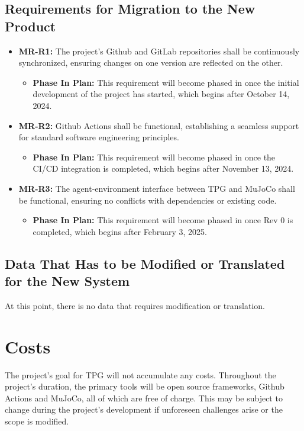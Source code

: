 \documentclass[12pt]{article}
\begin{document}
\subsection{Requirements for Migration to the New Product}
\begin{itemize}
  \item \label{MR-R1} \textbf{MR-R1:} The project’s Github and GitLab repositories shall be continuously synchronized, ensuring changes on one version are reflected on the other.
  
\begin{itemize}
  \item \textbf{Phase In Plan:} This requirement will become phased in once the initial development of the project has started, which begins after October 14, 2024. 

\end{itemize}

  \item \label{MR-R2} \textbf{MR-R2:} Github Actions shall be functional, establishing a seamless support for standard software engineering principles.
  \begin{itemize}
  \item \textbf{Phase In Plan:} This requirement will become phased in once the CI/CD integration is completed, which begins after November 13, 2024. 
\end{itemize}
  \item \label{MR-R3} \textbf{MR-R3:} The agent-environment interface between TPG and MuJoCo shall be functional, ensuring no conflicts with dependencies or existing code.
  \begin{itemize}
  \item \textbf{Phase In Plan:} This requirement will become phased in once Rev 0 is completed, which begins after February 3, 2025. 
\end{itemize}
\end{itemize}

\subsection{Data That Has to be Modified or Translated for the New System}
At this point, there is no data that requires modification or translation.

\section{Costs}
The project's goal for TPG will not accumulate any costs. Throughout the project's duration, the primary tools will be open source frameworks, Github Actions and MuJoCo, all of which are free of charge. This may be subject to change during the project's development if unforeseen challenges arise or the scope is modified.
\end{document}
